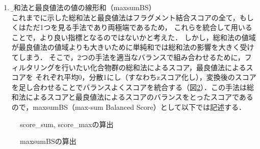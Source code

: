 \begin{enumerate}
\item \b{総和法と最良値法の値の線形和（maxsumBS）}\\
これまでに示した総和法と最良値法はフラグメント結合スコアの全て，もしくはただ1つを見る手法であり両極端であるため，
これらを統合して用いることで，より良い指標となるのではないかと考えた．
しかし，総和法の値域が最良値法の値域よりも大きいために単純和では総和法の影響を大きく受けてしまう．
そこで，2つの手法を適当なバランスで組み合わせるために，フィルタリングを行いたい化合物群の総和法によるスコア，最良値法によるスコアを
それぞれ平均0，分散1にし（すなわちzスコア化し），変換後のスコアを足し合わせることでバランスよくスコアを統合する（図\ref{fig:maxsumBS}）．この手法は総和法によるスコアと最良値法によるスコアのバランスをとったスコアであるので，maxsumBS（max-sum Balanced Score）として以下では記述する．
\end{enumerate}

\begin{figure}[h]
 \begin{center}
  \caption{score\_sum, score\_maxの算出}
  \label{fig:scoring}
 \end{center}
\end{figure}

\begin{figure}[hb]
 \begin{center}
  \caption{maxsumBSの算出}
  \label{fig:maxsumBS}
 \end{center}
\end{figure}